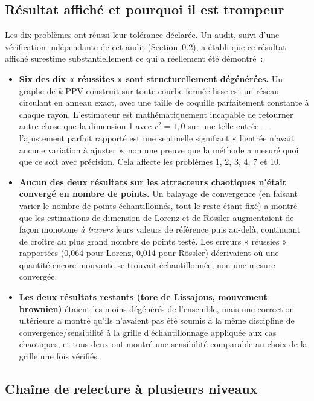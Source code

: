 \documentclass[11pt,a4paper]{article}
\begin{document}
\subsection{Résultat affiché et pourquoi il est trompeur}

Les dix problèmes ont réussi leur tolérance déclarée. Un audit, suivi d'une
vérification indépendante de cet audit
(Section~\ref{sec:chaine-audit}), a établi que ce résultat affiché
surestime substantiellement ce qui a réellement été démontré~:

\begin{itemize}
\item \textbf{Six des dix « réussites » sont structurellement dégénérées.}
  Un graphe de $k$-PPV construit sur toute courbe fermée lisse est un
  réseau circulant en anneau exact, avec une taille de coquille
  parfaitement constante à chaque rayon. L'estimateur est
  mathématiquement incapable de retourner autre chose que la dimension 1
  avec $r^2=1,0$ sur une telle entrée --- l'ajustement parfait rapporté
  est une sentinelle signifiant « l'entrée n'avait aucune variation à
  ajuster », non une preuve que la méthode a mesuré quoi que ce soit avec
  précision. Cela affecte les problèmes 1, 2, 3, 4, 7 et 10.
\item \textbf{Aucun des deux résultats sur les attracteurs chaotiques
  n'était convergé en nombre de points.} Un balayage de convergence (en
  faisant varier le nombre de points échantillonnés, tout le reste étant
  fixé) a montré que les estimations de dimension de Lorenz et de
  R\"ossler augmentaient de façon monotone \emph{à travers} leurs valeurs
  de référence puis au-delà, continuant de croître au plus grand nombre
  de points testé. Les erreurs « réussies » rapportées (0,064 pour
  Lorenz, 0,014 pour R\"ossler) décrivaient où une quantité encore
  mouvante se trouvait échantillonnée, non une mesure convergée.
\item \textbf{Les deux résultats restants (tore de Lissajous, mouvement
  brownien)} étaient les moins dégénérés de l'ensemble, mais une
  correction ultérieure a montré qu'ils n'avaient pas été soumis à la
  même discipline de convergence/sensibilité à la grille
  d'échantillonnage appliquée aux cas chaotiques, et tous deux ont montré
  une sensibilité comparable au choix de la grille une fois vérifiés.
\end{itemize}

\subsection{Chaîne de relecture à plusieurs niveaux}
\label{sec:chaine-audit}
\end{document}
